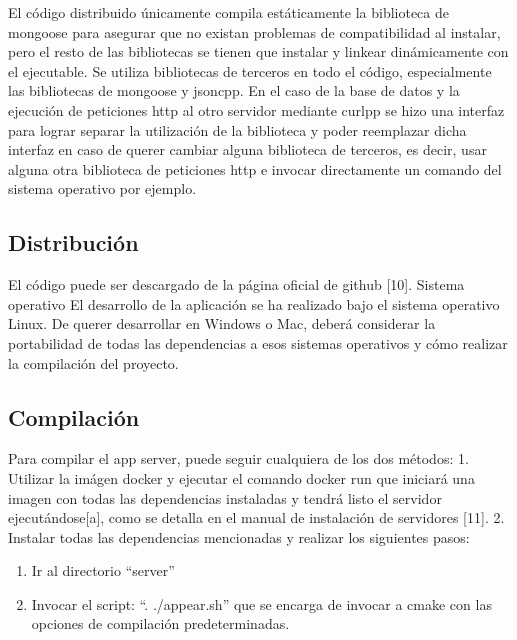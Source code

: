 \documentclass[a4paper,10pt,spanish]{sphinxmanual}
\begin{document}
El código distribuido únicamente compila estáticamente la biblioteca de mongoose para asegurar que no existan problemas de compatibilidad al instalar, pero el resto de las bibliotecas se tienen que instalar y linkear dinámicamente con el ejecutable.
Se utiliza bibliotecas de terceros en todo el código, especialmente las bibliotecas de mongoose y jsoncpp. En el caso de la base de datos y la ejecución de peticiones http al otro servidor mediante curlpp se hizo una interfaz para lograr separar la utilización de la biblioteca y poder reemplazar dicha interfaz en caso de querer cambiar alguna biblioteca de terceros, es decir, usar alguna otra biblioteca de peticiones http e invocar directamente un comando del sistema operativo por ejemplo.


\subsection{Distribución}
\label{docTecnica:distribucion}
El código puede ser descargado de la página oficial de github {[}10{]}.
Sistema operativo
El desarrollo de la aplicación se ha realizado bajo el sistema operativo Linux. De querer desarrollar en Windows o Mac, deberá considerar la portabilidad de todas las dependencias a esos sistemas operativos y cómo realizar la compilación del proyecto.


\subsection{Compilación}
\label{docTecnica:compilacion}
Para compilar el app server, puede seguir cualquiera de los dos métodos:
1. Utilizar la imágen docker y ejecutar el comando docker run que iniciará una imagen con todas las dependencias instaladas y tendrá listo el servidor ejecutándose{[}a{]}, como se detalla en el manual de instalación de servidores {[}11{]}.
2. Instalar todas las dependencias mencionadas y realizar los siguientes pasos:
\begin{enumerate}
\item {} 
Ir al directorio “server”

\item {} 
Invocar el script: “. ./appear.sh” que se encarga de invocar a cmake con las opciones de compilación predeterminadas.

\end{enumerate}
\end{document}

